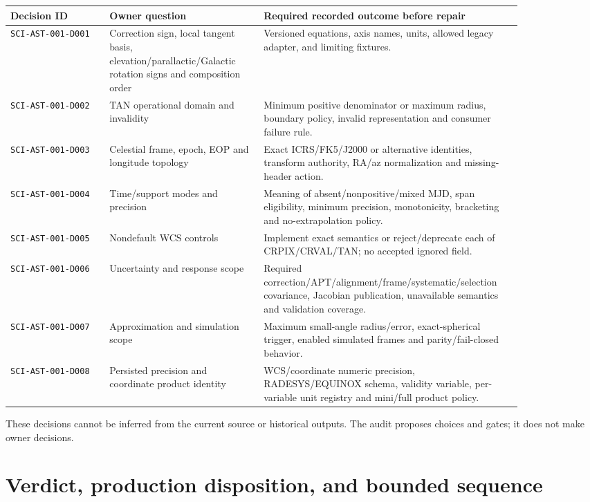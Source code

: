\documentclass[11pt]{article}
\newcommand{\code}[1]{\nolinkurl{#1}}
\begin{document}
\begin{longtable}{L{0.18\linewidth}L{0.29\linewidth}L{0.39\linewidth}}
\toprule
Decision ID & Owner question & Required recorded outcome before repair \\
\midrule
\endhead
\code{SCI-AST-001-D001} & Correction sign, local tangent basis, elevation/parallactic/Galactic rotation signs and composition order & Versioned equations, axis names, units, allowed legacy adapter, and limiting fixtures. \\
\code{SCI-AST-001-D002} & TAN operational domain and invalidity & Minimum positive denominator or maximum radius, boundary policy, invalid representation and consumer failure rule. \\
\code{SCI-AST-001-D003} & Celestial frame, epoch, EOP and longitude topology & Exact ICRS/FK5/J2000 or alternative identities, transform authority, RA/az normalization and missing-header action. \\
\code{SCI-AST-001-D004} & Time/support modes and precision & Meaning of absent/nonpositive/mixed MJD, span eligibility, minimum precision, monotonicity, bracketing and no-extrapolation policy. \\
\code{SCI-AST-001-D005} & Nondefault WCS controls & Implement exact semantics or reject/deprecate each of CRPIX/CRVAL/TAN; no accepted ignored field. \\
\code{SCI-AST-001-D006} & Uncertainty and response scope & Required correction/APT/alignment/frame/systematic/selection covariance, Jacobian publication, unavailable semantics and validation coverage. \\
\code{SCI-AST-001-D007} & Approximation and simulation scope & Maximum small-angle radius/error, exact-spherical trigger, enabled simulated frames and parity/fail-closed behavior. \\
\code{SCI-AST-001-D008} & Persisted precision and coordinate product identity & WCS/coordinate numeric precision, RADESYS/EQUINOX schema, validity variable, per-variable unit registry and mini/full product policy. \\
\bottomrule
\end{longtable}

These decisions cannot be inferred from the current source or historical
outputs. The audit proposes choices and gates; it does not make owner decisions.

\section{Verdict, production disposition, and bounded sequence}
\end{document}
